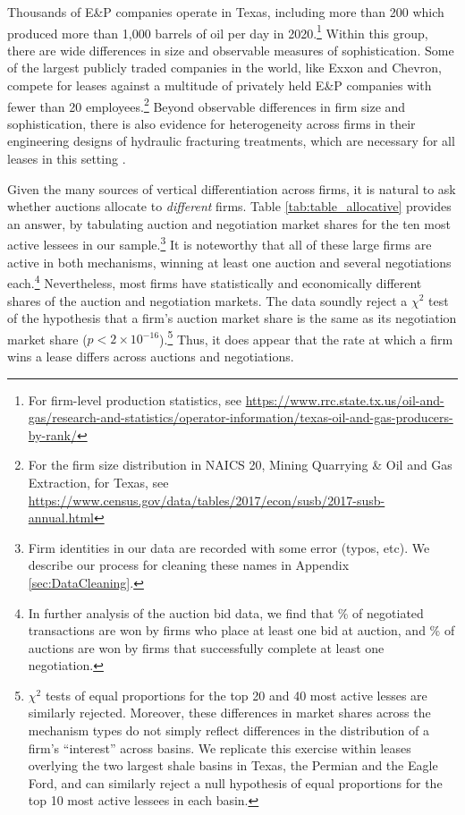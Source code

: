 \documentclass[12pt]{article}
\newcommand{\inputy}[1]{\unskip}
\begin{document}
Thousands of E\&P companies operate in Texas, including more than 200 which produced more than 1,000 barrels of oil per day in 2020.\footnote{For firm-level production statistics, see \url{https://www.rrc.state.tx.us/oil-and-gas/research-and-statistics/operator-information/texas-oil-and-gas-producers-by-rank/}} Within this group, there are wide differences in size and observable measures of sophistication. Some of the largest publicly traded companies in the world, like Exxon and Chevron, compete for leases against a multitude of privately held E\&P companies with fewer than 20 employees.\footnote{For the firm size distribution in NAICS 20, Mining Quarrying \& Oil and Gas Extraction, for Texas, see \url{https://www.census.gov/data/tables/2017/econ/susb/2017-susb-annual.html}} Beyond observable differences in firm size and sophistication, there is also evidence for heterogeneity across firms in their engineering designs of hydraulic fracturing treatments, which are necessary for all leases in this setting \citep{bib:covert}. 

Given the many sources of vertical differentiation across firms, it is natural to ask whether auctions allocate to \textit{different} firms. Table \ref{tab:table_allocative} provides an answer, by tabulating auction and negotiation market shares for the ten most active lessees in our sample.\footnote{Firm identities in our data are recorded with some error (typos, etc). We describe our process for cleaning these names in Appendix \ref{sec:DataCleaning}.}  It is noteworthy that all of these large firms are active in both mechanisms, winning at least one auction and several negotiations each.\footnote{In further analysis of the auction bid data, we find that \inputy{../output/estimates/ever_bidder_negotiation_share.tex}\% of negotiated transactions are won by firms who place at least one bid at auction, and \inputy{../output/estimates/negotiation_winner_auction_share.tex}\% of auctions are won by firms that successfully complete at least one negotiation.}  Nevertheless, most firms have statistically and economically different shares of the auction and negotiation markets. The data soundly reject a $\chi^2$ test of the hypothesis that a firm's auction market share is the same as its negotiation market share  ($p<2\times 10^{-16}$).\footnote{$\chi^2$ tests of equal proportions for the top 20 and 40 most active lesses are similarly rejected.  Moreover, these differences in market shares across the mechanism types do not simply reflect differences in the distribution of a firm's ``interest'' across basins. We replicate this exercise within leases overlying the two largest shale basins in Texas, the Permian and the Eagle Ford, and can similarly reject a null hypothesis of equal proportions for the top 10 most active lessees in each basin.}  Thus, it does appear that the rate at which a firm wins a lease differs across auctions and negotiations.  
\end{document}
